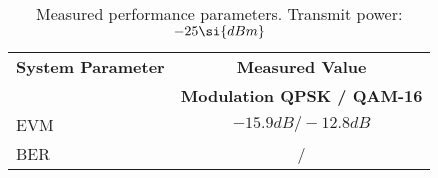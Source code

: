 \begin{table}[htbp]
  \centering
  \caption{Measured performance parameters. Transmit power: $\measPWRbad \si{dBm}$}
    \begin{tabular}{lc}
    \rowcolor[rgb]{ 0,  0,  0} \textcolor[rgb]{ 1,  1,  1}{\textbf{System Parameter}}	& \textcolor[rgb]{ 1,  1,  1}{\textbf{Measured Value}} 		\\
    \rowcolor[rgb]{ 0,  0,  0} \textcolor[rgb]{ 1,  1,  1}{} & \textcolor[rgb]{ 1,  1,  1}{\textbf{Modulation QPSK / QAM-16}}					\\

    	EVM 													& $-15.9\si{dB} / -12.8\si{dB}$					\\
    	BER			 											& \measBERQPSKBad / \measBERQAMBad		\\
 \end{tabular}
  \label{tab:meas_params_bad}
\end{table}